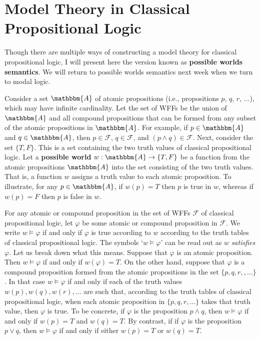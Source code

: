 \documentclass[11pt]{article}
\theoremstyle{definition}
\theoremstyle{remark}
\begin{document}
\section{Model Theory in Classical Propositional Logic}
Though there are multiple ways of constructing a model theory for classical propositional logic, I will present here the version known as \textbf{possible worlds semantics}. We will return to possible worlds semantics next week when we turn to modal logic.\par 

Consider a set $\mathbbm{A}$ of atomic propositions (i.e., propositions $p$, $q$, $r$, $\dots$), which may have infinite cardinality. Let the set of WFFs be the union of $\mathbbm{A}$ and all compound propositions that can be formed from any subset of the atomic propositions in $\mathbbm{A}$. For example, if $p\in\mathbbm{A}$ and $q\in\mathbbm{A}$, then $p\in\mathcal{F}$, $q\in\mathcal{F}$, and $(p\wedge q)\in\mathcal{F}$. Next, consider the set $\{T,F\}$. This is a set containing the two truth values of classical propositional logic. Let a \textbf{possible world} $w:\mathbbm{A}\rightarrow\{T,F\}$ be a function from the atomic propositions $\mathbbm{A}$ into the set consisting of the two truth values. That is, a function $w$ assigns a truth value to each atomic proposition. To illustrate, for any $p\in\mathbbm{A}$, if $w(p)=T$ then $p$ is true in $w$, whereas if $w(p)=F$ then $p$ is false in $w$.\par 


For any atomic or compound proposition in the set of WFFs $\mathcal{F}$ of classical propositional logic, let $\varphi$ be some atomic or compound proposition in $\mathcal{F}$. We write $w\vDash \varphi$ if and only if $\varphi$ is true according to $w$ according to the truth tables of classical propositional logic. The symbols `$w\vDash \varphi$' can be read out as $w$ \textit{satisfies} $\varphi$. Let us break down what this means. Suppose that $\varphi$ is an atomic proposition. Then $w\vDash \varphi$ if and only if $w(\varphi)=T$. On the other hand, suppose that $\varphi$ is a compound proposition formed from the atomic propositions in the set $\{p,q,r,,\dots\}$. In that case $w\vDash \varphi$ if and only if each of the truth values $w(p),w(q),w(r),\dots$ are such that, according to the truth tables of classical propositional logic, when each atomic proposition in $\{p,q,r,\dots\}$ takes that truth value, then $\varphi$ is true. To be concrete, if $\varphi$ is the proposition $p\wedge q$, then $w\vDash \varphi$ if and only if $w(p)=T$ and $w(q)=T$. By contrast, if if $\varphi$ is the proposition $p\vee q$, then $w\vDash \varphi$ if and only if either $w(p)=T$ or $w(q)=T$. 
\end{document}
